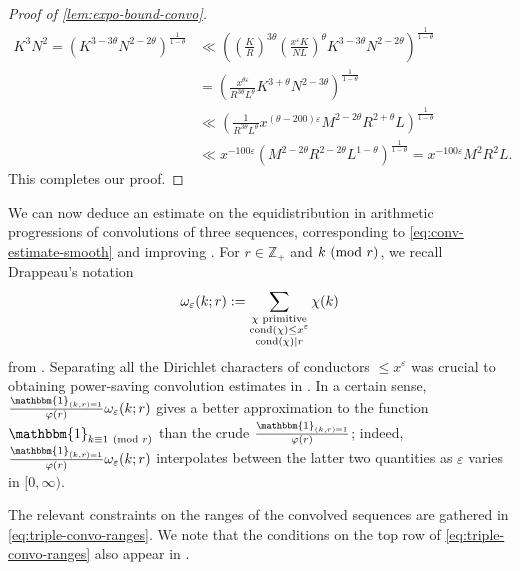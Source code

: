 \documentclass[reqno,11pt]{amsart}
\theoremstyle{remark}
\numberwithin{equation}{section}
\newcommand{\Z}{\mathbb{Z}}
\newcommand{\one}{\mathbbm{1}}
\newcommand{\eps}{\varepsilon}
\newcommand{\cond}{\textnormal{cond}}
\renewcommand{\pmod}[1]{\ (\textnormal{mod } #1)}
\begin{document}
\begin{proof}[Proof of \cref{lem:expo-bound-convo}]
\[
\begin{aligned}
    K^3 N^2 
    =
    \left(K^{3-3\theta} N^{2-2\theta}\right)^{\frac{1}{1-\theta}}
    &\ll 
    \left(\left(\frac{K}{R}\right)^{3\theta} \left(\frac{x^\eps K}{NL}\right)^{\theta} K^{3-3\theta} N^{2-2\theta}\right)^{\frac{1}{1-\theta}}
    \\
    &= 
    \left( \frac{x^{\theta\eps}}{R^{3\theta} L^\theta} K^{3+\theta} N^{2-3\theta}\right)^{\frac{1}{1-\theta}}
    \\
    &\ll 
    \left( \frac{1}{R^{3\theta} L^\theta} x^{(\theta-200)\eps} M^{2-2\theta} R^{2+\theta} L\right)^{\frac{1}{1-\theta}}
    \\
    &\ll 
    x^{-100\eps}
    \left(M^{2-2\theta} R^{2-2\theta} L^{1-\theta} \right)^{\frac{1}{1-\theta}}
    =
    x^{-100\eps}
    M^2 R^2 L.
\end{aligned}
\]
This completes our proof.
\end{proof}


We can now deduce an estimate on the equidistribution in arithmetic progressions of convolutions of three sequences, corresponding to \cref{eq:conv-estimate-smooth} and improving \cite[Th\'eor\`eme 3]{drappeau2015theoremes}. For $r \in \Z_+$ and $k \pmod{r}$, we recall Drappeau's notation 
\begin{equation} \label{eq:small-cond-chars}
    \omega_\eps(k; r) := \sum_{\substack{\chi \text{ primitive} \\ \cond(\chi) \le x^\eps \\ \cond(\chi) \mid r}} \chi(k)
\end{equation}
from \cite[(3.1)]{drappeau2015theoremes}. Separating all the Dirichlet characters of conductors $\le x^\eps$ was crucial to obtaining power-saving convolution estimates in \cite{drappeau2015theoremes}. In a certain sense, $\tfrac{\one_{(k, r) = 1}}{\varphi(r)} \omega_\eps(k; r)$ gives a better approximation to the function $\one_{k \equiv 1 \pmod{r}}$ than the crude $\tfrac{\one_{(k, r) = 1}}{\varphi(r)}$; indeed, $\tfrac{\one_{(k, r) = 1}}{\varphi(r)} \omega_\eps(k; r)$ interpolates between the latter two quantities as $\eps$ varies in $[0, \infty)$.

The relevant constraints on the ranges of the convolved sequences are gathered in \cref{eq:triple-convo-ranges}. We note that the conditions on the top row of \cref{eq:triple-convo-ranges} also appear in \cite[Th\'eor\`eme 3]{drappeau2015theoremes}.
\end{document}
